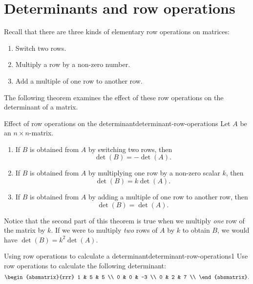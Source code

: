 \section{Determinants and row operations}

Recall that there are three kinds of elementary row operations%
%
%
%
 on matrices:
\begin{enumerate}
\item Switch two rows.
\item Multiply a row by a non-zero number.
\item Add a multiple of one row to another row.
\end{enumerate}
The following theorem examines the effect of these row operations on
the determinant of a matrix.

\begin{theorem}{Effect of row operations on the determinant}{determinant-row-operations}
  Let $A$ be an $n\times n$-matrix.
  \begin{enumerate}
  \item If $B$ is obtained from $A$ by switching two rows, then
    \begin{equation*}
      \det(B) = -\det(A).
    \end{equation*}
  \item If $B$ is obtained from $A$ by multiplying one row by a
    non-zero scalar $k$, then
    \begin{equation*}
      \det(B) = k\det(A).
    \end{equation*}
  \item If $B$ is obtained from $A$ by adding a multiple of one row to
    another row, then
    \begin{equation*}
      \det(B) = \det(A).
    \end{equation*}
  \end{enumerate}
\end{theorem}

Notice that the second part of this theorem is true when we multiply
{\em one} row of the matrix by $k$.  If we were to multiply {\em two}
rows of $A$ by $k$ to obtain $B$, we would have
$\det(B) = k^2 \det(A)$.

\begin{example}{Using row operations to calculate a determinant}{determinant-row-operations1}
  Use row operations to calculate the following determinant:
  \begin{equation*}
    \begin{absmatrix}{rrr}
      1 & 5 & 5 \\
      0 & 0 & -3 \\
      0 & 2 & 7 \\
    \end{absmatrix}.
  \end{equation*}
\end{example}


